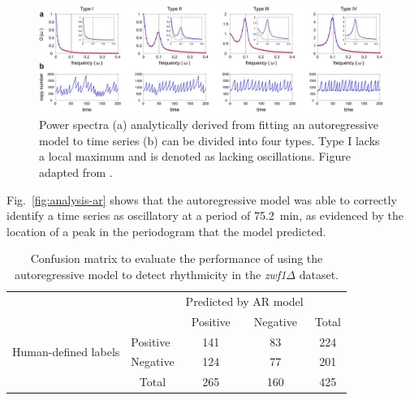 \begin{figure}
  \centering
  \includegraphics[width=1.0\textwidth]{jiaFrequencyDomainAnalysis2020_2ab_adapted}
  \caption[
    Power spectra analytically derived from fitting an autoregressive model to time series can be divided into four types.
  ]{
    Power spectra (a) analytically derived from fitting an autoregressive model to time series (b) can be divided into four types.
    Type I lacks a local maximum and is denoted as lacking oscillations.
    Figure adapted from \textcite{jiaFrequencyDomainAnalysis2020}.
  }
  \label{fig:analysis-ar-classification}
\end{figure}

Fig.\ \ref{fig:analysis-ar} shows that the autoregressive model was able to correctly identify a time series as oscillatory at a period of \SI{75.2}{\minute}, as evidenced by the location of a peak in the periodogram that the model predicted.


\begin{table}
  \centering
  \begin{tabular}{l|l|c|c|c}
    \multicolumn{2}{c}{}&\multicolumn{2}{c}{Predicted by AR model}&\\
    \cline{3-4}
    \multicolumn{2}{c|}{}&Positive&Negative&\multicolumn{1}{c}{Total}\\
    \cline{2-4}
    \multirow{2}{*}{Human-defined labels}& Positive & 141 & 83 & 224\\
    \cline{2-4}
    & Negative & 124 & 77 & 201\\
    \cline{2-4}
    \multicolumn{1}{c}{} & \multicolumn{1}{c}{Total} & \multicolumn{1}{c}{265} & \multicolumn{1}{c}{160} & \multicolumn{1}{c}{425}\\
  \end{tabular}
  \caption[
    Confusion matrix to evaluate the performance of using the autoregressive model \parencite{jiaFrequencyDomainAnalysis2020} to detect rhythmicity.
  ]{
    Confusion matrix to evaluate the performance of using the autoregressive model \parencite{jiaFrequencyDomainAnalysis2020} to detect rhythmicity in the \textit{zwf1$\Delta$} dataset.
  }
  \label{tab:analysis-ar-confusion-matrix}
\end{table}

